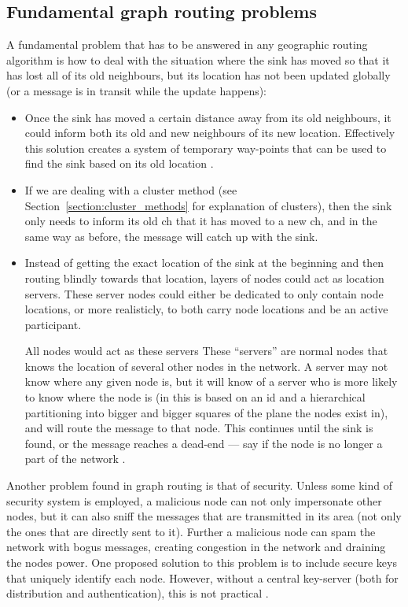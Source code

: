 \subsection{Fundamental graph routing problems}
A fundamental problem that has to be answered in any geographic routing algorithm is how to deal with the situation where the sink has moved so that it has lost all of its old neighbours, but its location has not been updated globally (or a message is in transit while the update happens):

\begin{itemize}
\item Once the sink has moved a certain distance away from its old neighbours, it could inform both its old and new neighbours of its new location. Effectively this solution creates a system of temporary way-points that can be used to find the sink based on its old location \cite{adaptive}.
\item If we are dealing with a cluster method (see Section~\ref{section:cluster_methods} for explanation of clusters), then the sink only needs to inform its old \ac{ch} that it has moved to a new \ac{ch}, and in the same way as before, the message will catch up with the sink.
\item Instead of getting the exact location of the sink at the beginning and then routing blindly towards that location, layers of nodes could act as location servers. These server nodes could either be dedicated to only contain node locations, or more realisticly, to both carry node locations and be an active participant. 

All nodes would act as these servers These ``servers'' are normal nodes that knows the location of several other nodes in the network. A server may not know where any given node is, but it will know of a server who is more likely to know where the node is (in \cite{scaleLocation} this is based on an id and a hierarchical partitioning into bigger and bigger squares of the plane the nodes exist in), and will route the message to that node. This continues until the sink is found, or the message reaches a dead-end --- say if the node is no longer a part of the network \cite{scaleLocation}.
\end{itemize}

Another problem found in graph routing is that of security. Unless some kind of security system is employed, a malicious node can not only impersonate other nodes, but it can also sniff the messages that are transmitted in its area (not only the ones that are directly sent to it). Further a malicious node can spam the network with bogus messages, creating congestion in the network and draining the nodes power. One proposed solution to this problem is to include secure keys that uniquely identify each node. However, without a central key-server (both for distribution and authentication), this is not practical \cite{trustedRouting}.

